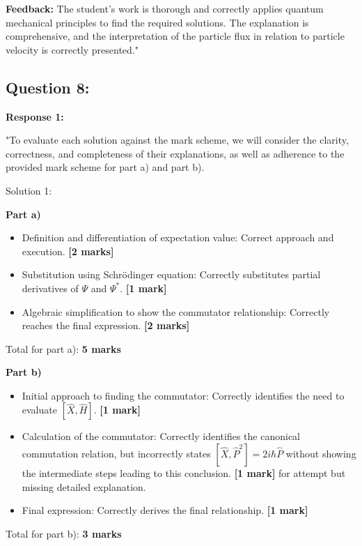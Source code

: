 \documentclass[a4paper,11pt]{article}
\begin{document}
\textbf{Feedback:} The student's work is thorough and correctly applies quantum mechanical principles to find the required solutions. The explanation is comprehensive, and the interpretation of the particle flux in relation to particle velocity is correctly presented."

\subsection*{Question 8:}

\textbf{Response 1:}

"To evaluate each solution against the mark scheme, we will consider the clarity, correctness, and completeness of their explanations, as well as adherence to the provided mark scheme for part a) and part b).

Solution 1:

\textbf{Part a)}

\begin{itemize}
    \item Definition and differentiation of expectation value: Correct approach and execution. \textbf{[2 marks]}
    \item Substitution using Schrödinger equation: Correctly substitutes partial derivatives of \(\Psi\) and \(\Psi^*\). \textbf{[1 mark]}
    \item Algebraic simplification to show the commutator relationship: Correctly reaches the final expression. \textbf{[2 marks]}
\end{itemize}

Total for part a): \textbf{5 marks}

\textbf{Part b)}

\begin{itemize}
    \item Initial approach to finding the commutator: Correctly identifies the need to evaluate \(\left[\hat{X}, \hat{H}\right]\). \textbf{[1 mark]}
    \item Calculation of the commutator: Correctly identifies the canonical commutation relation, but incorrectly states \( \left[ \hat{X}, \hat{P}^2 \right] = 2i\hbar\hat{P} \) without showing the intermediate steps leading to this conclusion. \textbf{[1 mark]} for attempt but missing detailed explanation.
    \item Final expression: Correctly derives the final relationship. \textbf{[1 mark]}
\end{itemize}

Total for part b): \textbf{3 marks}
\end{document}
